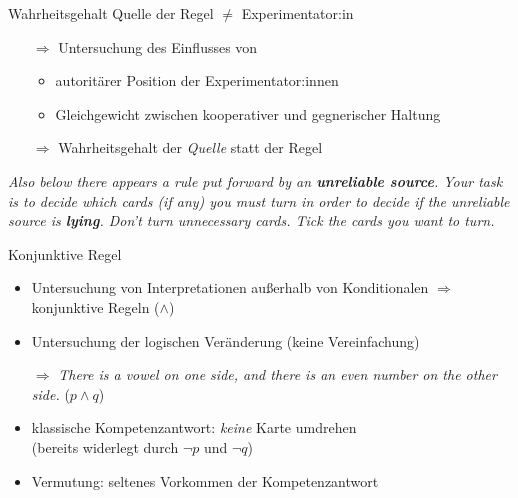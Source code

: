 \begin{frame}{Wahrheitsgehalt {\scriptsize \cite[S.~97-98]{stenningHumanReasoningCognitive2008}}}
    Quelle der Regel $\ne$ Experimentator:in

    \begin{itemize}
        \item[$\Rightarrow$] Untersuchung des Einflusses von
        \begin{itemize}
            \item autoritärer Position der Experimentator:innen
            \item Gleichgewicht zwischen kooperativer und gegnerischer Haltung
        \end{itemize}

        \item[$\Rightarrow$] Wahrheitsgehalt der \emph{Quelle} statt der Regel
    \end{itemize}

    \emph{ \small
        Also below there appears a rule {\normalsize \alert{put forward by an \textbf{unreliable source}}}.
        Your task is to decide which cards (if any) you must turn in order to decide {\normalsize \alert{if the unreliable source is \textbf{lying}}}.
        Don't turn unnecessary cards. Tick the cards you want to turn.
    }
\end{frame}


\begin{frame}{Konjunktive Regel {\scriptsize \cite[S.~99]{stenningHumanReasoningCognitive2008}}}
    \begin{itemize}
        \item Untersuchung von Interpretationen außerhalb von Konditionalen
            $\Rightarrow$ konjunktive Regeln ($\land$)
        
        \item Untersuchung der logischen Veränderung (keine Vereinfachung)
        
        \item[$\Rightarrow$] \emph{There is a vowel on one side, \alert{and} there is an even number on the other side.} ($p \land q$)
        
        \item klassische Kompetenzantwort: \emph{keine} Karte umdrehen \\
            {\footnotesize (bereits widerlegt durch $\lnot p$ und $\lnot q$)}
        
        \item Vermutung: seltenes Vorkommen der Kompetenzantwort
    \end{itemize}
\end{frame}


